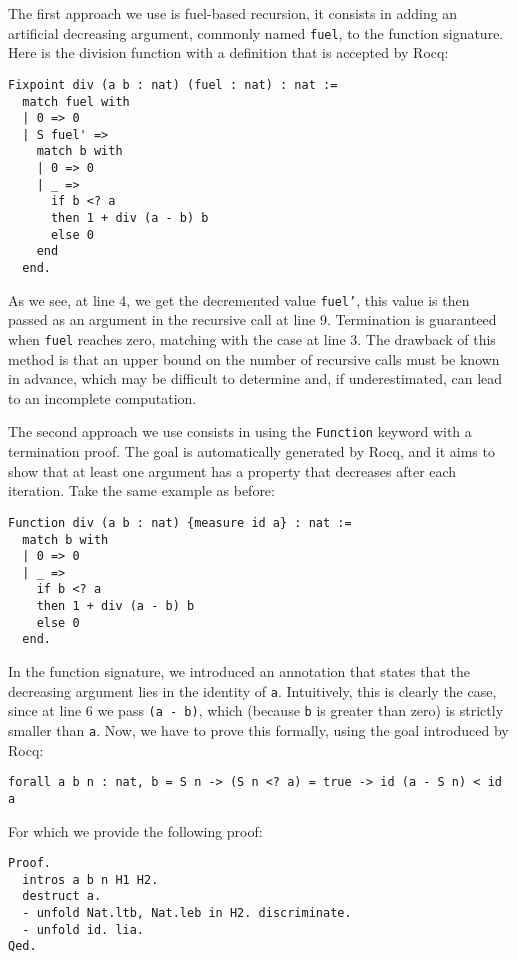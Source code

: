 The first approach we use is fuel-based recursion, it consists in adding an artificial decreasing argument, commonly named \texttt{fuel}, to the function signature.
Here is the division function with a definition that is accepted by Rocq:

\begin{lstlisting}[style=Rocq]
Fixpoint div (a b : nat) (fuel : nat) : nat :=
  match fuel with
  | 0 => 0
  | S fuel' =>
    match b with
    | 0 => 0
    | _ =>
      if b <? a
      then 1 + div (a - b) b
      else 0
    end
  end.
\end{lstlisting}

As we see, at line 4, we get the decremented value \texttt{fuel'}, this value is then passed as an argument in the recursive call at line 9.
Termination is guaranteed when \texttt{fuel} reaches zero, matching with the case at line 3.
The drawback of this method is that an upper bound on the number of recursive calls must be known in advance, which may be difficult to determine and, if underestimated, can lead to an incomplete computation.

The second approach we use consists in using the \texttt{Function} keyword with a termination proof. The goal is automatically generated by Rocq, and it aims to show that at least one argument has a property that decreases after each iteration.
Take the same example as before:

\begin{lstlisting}[style=Rocq]
Function div (a b : nat) {measure id a} : nat :=
  match b with
  | 0 => 0
  | _ =>
    if b <? a
    then 1 + div (a - b) b
    else 0
  end.
\end{lstlisting}

In the function signature, we introduced an annotation that states that the decreasing argument lies in the identity of \texttt a.
Intuitively, this is clearly the case, since at line 6 we pass \texttt{(a - b)}, which (because \texttt b is greater than zero) is strictly smaller than \texttt a.
Now, we have to prove this formally, using the goal introduced by Rocq:

\begin{lstlisting}[style=Rocq]
forall a b n : nat, b = S n -> (S n <? a) = true -> id (a - S n) < id a
\end{lstlisting}

For which we provide the following proof:

\begin{lstlisting}[style=Rocq]
Proof.
  intros a b n H1 H2.
  destruct a.
  - unfold Nat.ltb, Nat.leb in H2. discriminate.
  - unfold id. lia.
Qed.
\end{lstlisting}

